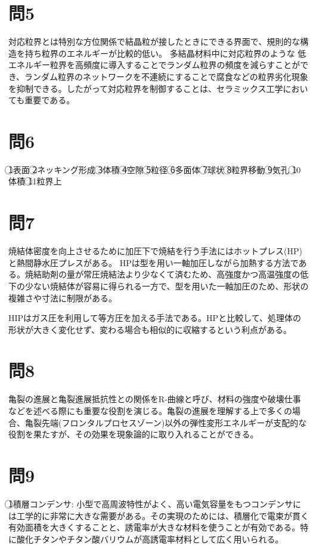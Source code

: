 \documentclass[11pt,a4paper]{jsarticle}
\begin{document}
\section*{問5}
対応粒界とは特別な方位関係で結晶粒が接したときにできる界面で、規則的な構造を持ち粒界のエネルギーが比較的低い。
多結晶材料中に対応粒界のような 低エネルギー粒界を高頻度に導入することでランダム粒界の頻度を減らすことができ、ランダム粒界のネットワークを不連続にすることで腐食などの粒界劣化現象を抑制できる\cite{konakawa}。したがって対応粒界を制御することは、セラミックス工学においても重要である。

\section*{問6}
\textcircled{\scriptsize 1}表面
\textcircled{\scriptsize 2}ネッキング形成
\textcircled{\scriptsize 3}体積
\textcircled{\scriptsize 4}空隙
\textcircled{\scriptsize 5}粒径
\textcircled{\scriptsize 6}多面体
\textcircled{\scriptsize 7}球状
\textcircled{\scriptsize 8}粒界移動
\textcircled{\scriptsize 9}気孔
\textcircled{\scriptsize 10}体積
\textcircled{\scriptsize 11}粒界上

\section*{問7}
焼結体密度を向上させるために加圧下で焼結を行う手法にはホットプレス(HP)と熱間静水圧プレスがある。
HPは型を用い一軸加圧しながら加熱する方法である。焼結助剤の量が常圧焼結法より少なくて済むため、高強度かつ高温強度の低下の少ない焼結体が容易に得られる一方で、型を用いた一軸加圧のため、形状の複雑さや寸法に制限がある。

HIPはガス圧を利用して等方圧を加える手法である。HPと比較して、処理体の形状が大きく変化せず、変わる場合も相似的に収縮するという利点がある。

\section*{問8}
亀裂の進展と亀裂進展抵抗性との関係をR-曲線と呼び、材料の強度や破壊仕事などを述べる際にも重要な役割を演じる。亀裂の進展を理解する上で多くの場合、亀裂先端(フロンタルプロセスゾーン)以外の弾性変形エネルギーが支配的な役割を果たすが、その効果を現象論的に取り入れることができる。

\section*{問9}
\textcircled{\scriptsize 1}積層コンデンサ: 
小型で高周波特性がよく、高い電気容量をもつコンデンサには工学的に非常に大きな需要がある。その実現のためには、積層化で電束が貫く有効面積を大きくすることと、誘電率が大きな材料を使うことが有効である。特に酸化チタンやチタン酸バリウムが高誘電率材料として広く用いられる。
\end{document}
